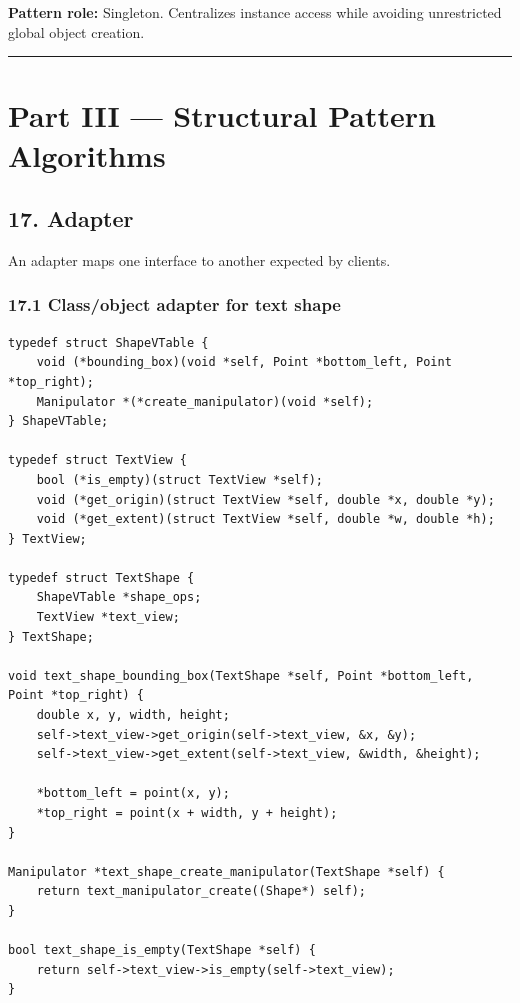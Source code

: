 \documentclass[11pt]{article}
\begin{document}
\textbf{Pattern role:} Singleton. Centralizes instance access while avoiding unrestricted global object creation.

\begin{center}\rule{0.5\linewidth}{0.5pt}\end{center}

\section{Part III --- Structural Pattern Algorithms}\label{part-iii-structural-pattern-algorithms}

\subsection{17. Adapter}\label{adapter}

An adapter maps one interface to another expected by clients.

\subsubsection{17.1 Class/object adapter for text shape}\label{classobject-adapter-for-text-shape}

\begin{verbatim}
typedef struct ShapeVTable {
    void (*bounding_box)(void *self, Point *bottom_left, Point *top_right);
    Manipulator *(*create_manipulator)(void *self);
} ShapeVTable;

typedef struct TextView {
    bool (*is_empty)(struct TextView *self);
    void (*get_origin)(struct TextView *self, double *x, double *y);
    void (*get_extent)(struct TextView *self, double *w, double *h);
} TextView;

typedef struct TextShape {
    ShapeVTable *shape_ops;
    TextView *text_view;
} TextShape;

void text_shape_bounding_box(TextShape *self, Point *bottom_left, Point *top_right) {
    double x, y, width, height;
    self->text_view->get_origin(self->text_view, &x, &y);
    self->text_view->get_extent(self->text_view, &width, &height);

    *bottom_left = point(x, y);
    *top_right = point(x + width, y + height);
}

Manipulator *text_shape_create_manipulator(TextShape *self) {
    return text_manipulator_create((Shape*) self);
}

bool text_shape_is_empty(TextShape *self) {
    return self->text_view->is_empty(self->text_view);
}
\end{verbatim}
\end{document}
